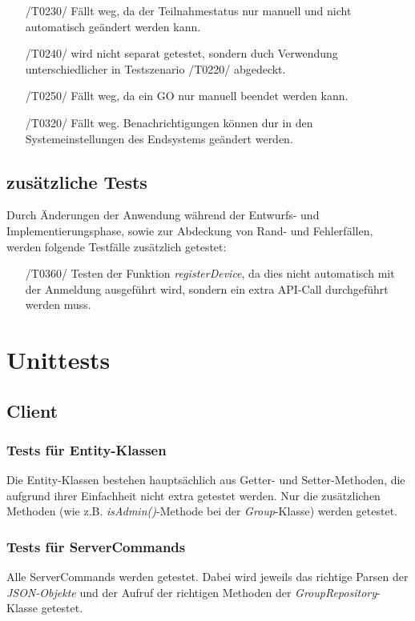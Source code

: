 \documentclass[11pt,a4paper]{scrartcl}
\begin{document}
\begin{itemize}
	\item[/T0230/] Fällt weg, da der Teilnahmestatus nur manuell und nicht automatisch geändert werden kann.
	
	\item[/T0240/] wird nicht separat getestet, sondern duch Verwendung unterschiedlicher in Testszenario /T0220/ abgedeckt.
	
	\item[/T0250/] Fällt weg, da ein GO nur manuell beendet werden kann.
	
	\item[/T0320/] Fällt weg. Benachrichtigungen können dur in den Systemeinstellungen des Endsystems geändert werden.
	
\end{itemize}

\subsection{zusätzliche Tests}
Durch Änderungen der Anwendung während der Entwurfs- und Implementierungsphase, sowie zur Abdeckung von Rand- und Fehlerfällen, werden folgende Testfälle zusätzlich getestet:
\begin{itemize}
	\item[/T0360/]\label{360} Testen der Funktion \textit{registerDevice}, da dies nicht automatisch mit der Anmeldung ausgeführt wird, sondern ein extra API-Call durchgeführt werden muss.
\end{itemize}

\newpage

\section{Unittests}

\subsection{Client}

\subsubsection{Tests für Entity-Klassen}
Die Entity-Klassen bestehen hauptsächlich aus Getter- und Setter-Methoden, die aufgrund ihrer Einfachheit nicht extra getestet werden. Nur die zusätzlichen Methoden (wie z.B. \textit{isAdmin()}-Methode bei der \textit{Group}-Klasse) werden getestet.

\subsubsection{Tests für ServerCommands}
Alle ServerCommands werden getestet. Dabei wird jeweils das richtige Parsen der \textit{JSON-Objekte} und der Aufruf der richtigen Methoden der \textit{GroupRepository}-Klasse getestet.
\end{document}
